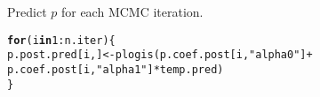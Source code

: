 \documentclass[color=usenames,dvipsnames]{beamer}\usepackage[]{graphicx}\usepackage[]{color}
\makeatletter
\newcommand{\hlnum}[1]{\textcolor[rgb]{0.69,0.494,0}{#1}}%
\newcommand{\hlstr}[1]{\textcolor[rgb]{0.749,0.012,0.012}{#1}}%
\newcommand{\hlopt}[1]{\textcolor[rgb]{0,0,0}{#1}}%
\newcommand{\hlstd}[1]{\textcolor[rgb]{0,0,0}{#1}}%
\newcommand{\hlkwa}[1]{\textcolor[rgb]{0,0,0}{\textbf{#1}}}%
\newcommand{\hlkwb}[1]{\textcolor[rgb]{0,0.341,0.682}{#1}}%
\newcommand{\hlkwd}[1]{\textcolor[rgb]{0.004,0.004,0.506}{#1}}%
\newenvironment{kframe}{%
 \def\at@end@of@kframe{}%
 \ifinner\ifhmode%
  \def\at@end@of@kframe{\end{minipage}}%
  \begin{minipage}{\columnwidth}%
 \fi\fi%
 \def\FrameCommand##1{\hskip\@totalleftmargin \hskip-\fboxsep
 \colorbox{shadecolor}{##1}\hskip-\fboxsep
     \hskip-\linewidth \hskip-\@totalleftmargin \hskip\columnwidth}%
 \MakeFramed {\advance\hsize-\width
   \@totalleftmargin\z@ \linewidth\hsize
   \@setminipage}}%
 {\par\unskip\endMakeFramed%
 \at@end@of@kframe}
\newenvironment{knitrout}{}{} %
\newcommand{\inr}[1]{\colorbox{inlinecolor}{\texttt{#1}}}
\makeatother
\begin{document}
\begin{frame}[fragile]
\begin{knitrout}
\begin{kframe}
{\ttfamily\noindent\bfseries\color{errorcolor}{\#\# Error in matrix(NA, nrow = n.iter, ncol = length(temp.pred)): object 'n.iter' not found}}\end{kframe}
\end{knitrout}
  \pause
  \vfill
  Predict $p$ for each MCMC iteration.
  \vspace{-6pt}
\begin{knitrout}\scriptsize
{}\color{fgcolor}\begin{kframe}
\begin{alltt}
\hlkwa{for}\hlstd{(i} \hlkwa{in} \hlnum{1}\hlopt{:}\hlstd{n.iter) \{}
    \hlstd{p.post.pred[i,]} \hlkwb{<-} \hlkwd{plogis}\hlstd{(p.coef.post[i,}\hlstr{"alpha0"}\hlstd{]} \hlopt{+}
                              \hlstd{p.coef.post[i,}\hlstr{"alpha1"}\hlstd{]}\hlopt{*}\hlstd{temp.pred)}
\hlstd{\}}
\end{alltt}


{\ttfamily\noindent\bfseries\color{errorcolor}{\#\# Error in eval(expr, envir, enclos): object 'n.iter' not found}}\end{kframe}
\end{knitrout}
\end{frame}
\end{document}
